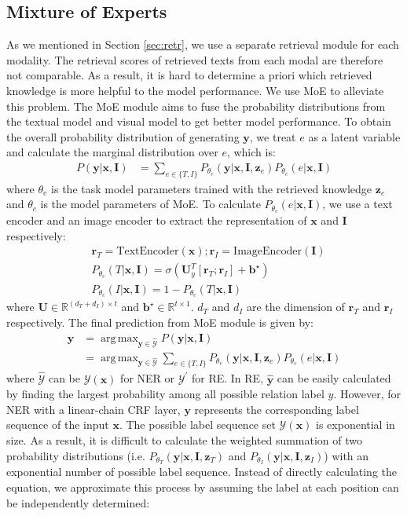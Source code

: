 \documentclass[11pt]{article}
\def\vb{{\bm{b}}}
\def\vr{{\bm{r}}}
\def\vx{{\bm{x}}}
\def\vy{{\bm{y}}}
\def\vz{{\bm{z}}}
\def\mI{{\bm{I}}}
\def\mU{{\bm{U}}}
\def\sR{{\mathbb{R}}}
\newcommand{\sigmoid}{\sigma}
\DeclareMathOperator*{\argmax}{arg\,max}
\begin{document}
\subsection{Mixture of Experts}
\label{sec:moe}
As we mentioned in Section \ref{sec:retr}, we use a separate retrieval module for each modality. The retrieval scores of retrieved texts from each modal are therefore not comparable. As a result, it is hard to determine a priori which retrieved knowledge is more helpful to the model performance. We use MoE to alleviate this problem. The MoE module aims to fuse the probability distributions from the textual model and visual model to get better model performance. To obtain the overall probability distribution of generating $\vy$, we treat $e$ as a latent variable and calculate the marginal distribution over $e$, which is:
\begin{align*}
    P(\vy|\vx,\mI) &= \sum\limits_{e \in \{T,I\}} P_{\theta_e}(\vy|\vx,\mI,\vz_e)P_{\theta_c}(e|\vx,\mI) 
\end{align*}
where ${\theta_e}$ is the task model parameters trained with the retrieved knowledge $\vz_e$ and ${\theta_c}$ is the model parameters of MoE. To calculate $P_{\theta_c}(e|\vx,\mI)$, we use a text encoder and an image encoder to extract the representation of $\vx$ and $\mI$ respectively:
\begin{align*}
    &\vr_T = \text{TextEncoder}(\vx); \vr_I = \text{ImageEncoder}(\mI)\\
    &P_{\theta_c}(T|\vx,\mI) = \sigmoid(\mU_{y}^{T} [\vr_T;\vr_I] + \vb^{\star})\\
    &P_{\theta_c}(I|\vx,\mI) = 1- P_{\theta_c}(T|\vx,\mI)
\end{align*}
where $\mU\in \sR^{(d_T+d_I)\times t}$ and $\vb^\star \in \sR^{t \times 1}$. $d_T$ and $d_I$ are the dimension of $\vr_T$ and $\vr_I$ respectively. The final prediction from MoE module is given by:
\begin{align*}
    \hat{\vy} & = \argmax_{\vy \in \hat{\mathcal{Y}}} P(\vy|\vx,\mI) \\
    &= \argmax_{\vy \in \hat{\mathcal{Y}}} \sum\limits_{e \in \{T,I\}} P_{\theta_e}(\vy|\vx,\mI,\vz_e)P_{\theta_c}(e|\vx,\mI) 
\end{align*}
where $\hat{\mathcal{Y}}$ can be $\mathcal{Y}(\vx)$ for NER or $\mathcal{Y}^\prime$ for RE. 
In RE, $\hat{\vy}$ can be easily calculated by finding the largest probability among all possible relation label $y$. However, for NER with a linear-chain CRF layer, $\vy$ represents the corresponding label sequence of the input $\vx$. The possible label sequence set $\mathcal{Y}(\vx)$ is exponential in size. As a result, it is difficult to calculate the weighted summation of two probability distributions (i.e. $P_{\theta_{T}}(\vy|\vx,\mI,\vz_T)$ and $P_{\theta_{I}}(\vy|\vx,\mI,\vz_I)$) with an exponential number of possible label sequence. Instead of directly calculating the equation, we approximate this process by assuming the label at each position can be independently determined:
\end{document}
